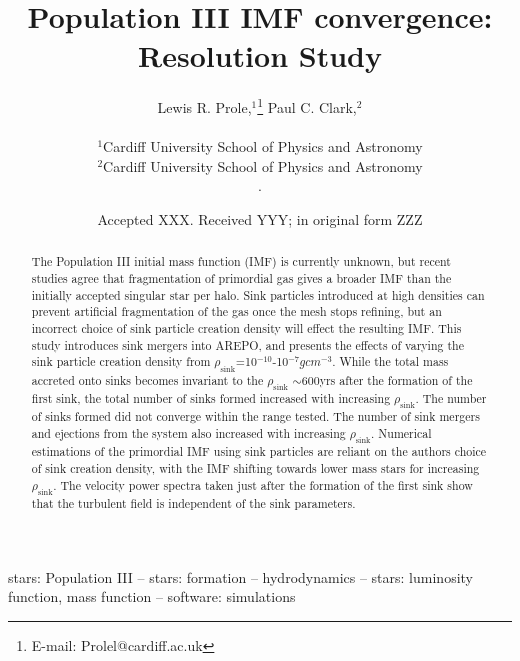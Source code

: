 \documentclass[fleqn,usenatbib]{mnras}
\title[Population III IMF convergence: Resolution Study]{Population III IMF convergence: Resolution Study}
\author[L. R. Prole]{
Lewis R. Prole,$^{1}$\thanks{E-mail: Prolel@cardiff.ac.uk}
Paul C. Clark,$^{2}$
$$
$$
\\
$^{1}$Cardiff University School of Physics and Astronomy\\
$^{2}$Cardiff University School of Physics and Astronomy\\
$.$
}
\date{Accepted XXX. Received YYY; in original form ZZZ}
\begin{document}
\label{firstpage}
\pagerange{\pageref{firstpage}--\pageref{lastpage}}
\maketitle

\begin{abstract}
The Population III initial mass function (IMF) is currently unknown, but recent studies agree that fragmentation of primordial gas gives a broader IMF than the initially accepted singular star per halo. Sink particles introduced at high densities can prevent artificial fragmentation of the gas once the mesh stops refining, but an incorrect choice of sink particle creation density will effect the resulting IMF. This study introduces sink mergers into AREPO, and presents the effects of varying the sink particle creation density from $\rho_{\text{sink}}$=10$^{-10}$-10$^{-7}gcm^{-3}$. While the total mass accreted onto sinks becomes invariant to the $\rho_{\text{sink}}$  $\sim$600yrs after the formation of the first sink, the total number of sinks formed increased with increasing $\rho_{\text{sink}}$. The number of sinks formed did not converge within the range tested. The number of sink mergers and ejections from the system also increased with increasing $\rho_{\text{sink}}$. Numerical estimations of the primordial IMF using sink particles are reliant on the authors choice of sink creation density, with the IMF shifting towards lower mass stars for increasing $\rho_{\text{sink}}$. The velocity power spectra taken just after the formation of the first sink show that the turbulent field is independent of the sink parameters. 
\end{abstract}

\begin{keywords}
stars: Population III -- stars: formation -- hydrodynamics -- stars: luminosity function, mass function -- software: simulations
\end{keywords}


\end{document}
